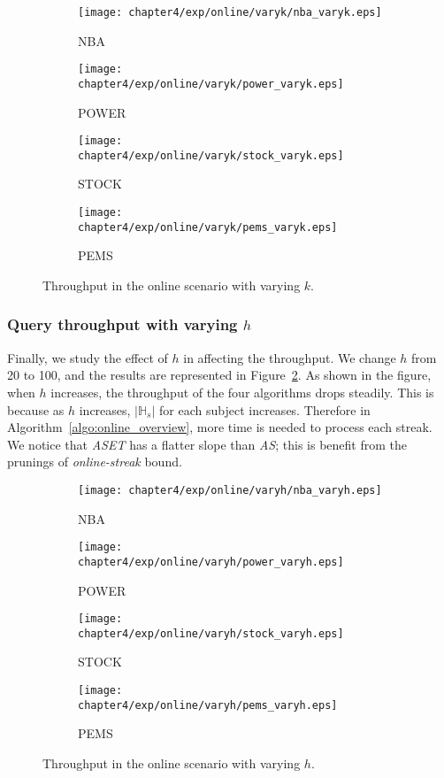 \begin{figure}[t]
\centering
    \begin{subfigure}[b]{0.45\textwidth}
        \texttt{[image: chapter4/exp/online/varyk/nba\_varyk.eps]}
        \caption{NBA}
    \end{subfigure}
    \begin{subfigure}[b]{0.45\textwidth}
        \texttt{[image: chapter4/exp/online/varyk/power\_varyk.eps]}
        \caption{POWER}
    \end{subfigure}
    \begin{subfigure}[b]{0.45\textwidth}
        \texttt{[image: chapter4/exp/online/varyk/stock\_varyk.eps]}
        \caption{STOCK}
    \end{subfigure}
    \begin{subfigure}[b]{0.45\textwidth}
        \texttt{[image: chapter4/exp/online/varyk/pems\_varyk.eps]}
        \caption{PEMS}
    \end{subfigure}
\caption{Throughput in the online scenario with varying $k$.}
\label{exp:online_mining_vary_k}
\end{figure}

\subsubsection{Query throughput with varying $h$}
Finally, we study the effect of $h$ in affecting the throughput.
We change $h$ from 20 to 100, and the results are represented in Figure~\ref{exp:online_mining_vary_h}.
As shown in the figure, when $h$ increases, 
the throughput of the four algorithms drops steadily.
This is because as $h$ increases, $|\mathbb{H}_s|$ for each subject
increases. Therefore in Algorithm~\ref{algo:online_overview}, more time is needed 
to process each streak. We notice that \emph{ASET} has a flatter slope than \emph{AS}; this
is benefit from the prunings of \emph{online-streak} bound.
\begin{figure}[h]
\centering
    \begin{subfigure}[b]{0.45\textwidth}
        \texttt{[image: chapter4/exp/online/varyh/nba\_varyh.eps]}
        \caption{NBA}
    \end{subfigure}
    \begin{subfigure}[b]{0.45\textwidth}
        \texttt{[image: chapter4/exp/online/varyh/power\_varyh.eps]}
        \caption{POWER}
    \end{subfigure}
    \begin{subfigure}[b]{0.45\textwidth}
        \texttt{[image: chapter4/exp/online/varyh/stock\_varyh.eps]}
        \caption{STOCK}
    \end{subfigure}
    \begin{subfigure}[b]{0.45\textwidth}
        \texttt{[image: chapter4/exp/online/varyh/pems\_varyh.eps]}
        \caption{PEMS}
    \end{subfigure}
\caption{Throughput in the online scenario with varying $h$.}
\label{exp:online_mining_vary_h}
\end{figure}

